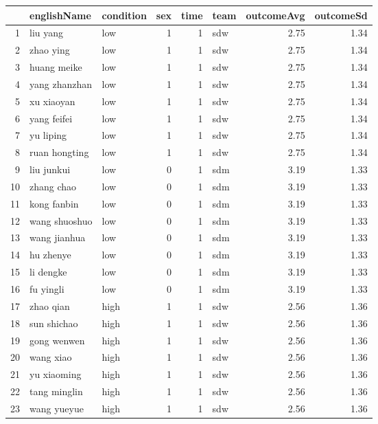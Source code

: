 \begin{table}[ht]
\centering
\begin{tabular}{rllrrlrr}
  \hline
 & englishName & condition & sex & time & team & outcomeAvg & outcomeSd \\ 
  \hline
1 & liu yang & low &   1 &   1 & sdw & 2.75 & 1.34 \\ 
  2 & zhao ying & low &   1 &   1 & sdw & 2.75 & 1.34 \\ 
  3 & huang meike & low &   1 &   1 & sdw & 2.75 & 1.34 \\ 
  4 & yang zhanzhan & low &   1 &   1 & sdw & 2.75 & 1.34 \\ 
  5 & xu xiaoyan & low &   1 &   1 & sdw & 2.75 & 1.34 \\ 
  6 & yang feifei & low &   1 &   1 & sdw & 2.75 & 1.34 \\ 
  7 & yu liping & low &   1 &   1 & sdw & 2.75 & 1.34 \\ 
  8 & ruan hongting & low &   1 &   1 & sdw & 2.75 & 1.34 \\ 
  9 & liu junkui & low &   0 &   1 & sdm & 3.19 & 1.33 \\ 
  10 & zhang chao & low &   0 &   1 & sdm & 3.19 & 1.33 \\ 
  11 & kong fanbin & low &   0 &   1 & sdm & 3.19 & 1.33 \\ 
  12 & wang shuoshuo & low &   0 &   1 & sdm & 3.19 & 1.33 \\ 
  13 & wang jianhua & low &   0 &   1 & sdm & 3.19 & 1.33 \\ 
  14 & hu zhenye & low &   0 &   1 & sdm & 3.19 & 1.33 \\ 
  15 & li dengke & low &   0 &   1 & sdm & 3.19 & 1.33 \\ 
  16 & fu yingli & low &   0 &   1 & sdm & 3.19 & 1.33 \\ 
  17 & zhao qian & high &   1 &   1 & sdw & 2.56 & 1.36 \\ 
  18 & sun shichao & high &   1 &   1 & sdw & 2.56 & 1.36 \\ 
  19 & gong wenwen & high &   1 &   1 & sdw & 2.56 & 1.36 \\ 
  20 & wang xiao & high &   1 &   1 & sdw & 2.56 & 1.36 \\ 
  21 & yu xiaoming & high &   1 &   1 & sdw & 2.56 & 1.36 \\ 
  22 & tang minglin & high &   1 &   1 & sdw & 2.56 & 1.36 \\ 
  23 & wang yueyue & high &   1 &   1 & sdw & 2.56 & 1.36 \\ 

\end{tabular}
\end{table}
